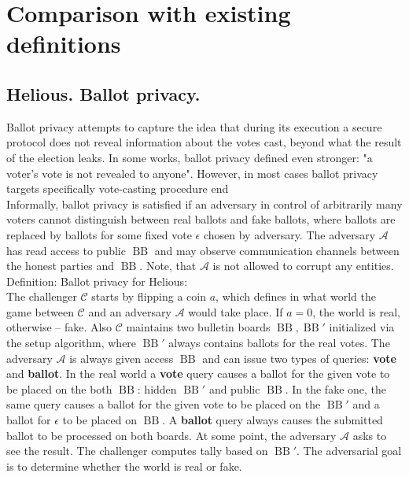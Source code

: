 \documentclass[12pt]{article}
\DeclareMathOperator{\bb}{BB}
\begin{document}
 \section{Comparison with existing definitions}
 \subsection{Helious. Ballot privacy.}
 Ballot privacy attempts to capture the idea that during its execution a secure protocol does not reveal information about the votes cast, beyond what the result of the election leaks. In some works, ballot privacy defined even stronger: "a voter's vote is not revealed to anyone". However, in most cases ballot privacy targets specifically vote-casting procedure end \\ 
  
Informally, ballot privacy is satisfied if an adversary in control of arbitrarily many voters cannot distinguish between real ballots and fake ballots, where ballots are replaced by ballots for some fixed vote $\epsilon$ chosen by adversary. The adversary $\mathcal{A}$ has read access to public $\bb$ and may observe communication channels between the honest parties and $\bb$. Note, that $\mathcal{A}$  is not allowed to corrupt any entities. \\

Definition: Ballot privacy for Helious:\\
The challenger $\mathcal{C}$ starts by flipping a coin $a$, which defines in what world the game between $\mathcal{C}$ and an adversary  $\mathcal{A}$ would take place.  If $a=0$, the world is real, otherwise -- fake. Also $\mathcal{C}$  maintains two bulletin boards $\bb,\bb'$ initialized via the setup algorithm, where $\bb'$ always contains ballots for the real votes.  The adversary $\mathcal{A}$ is always given access $\bb$ and can issue two types of queries: \textbf{vote} and \textbf{ballot}.  In the real world a \textbf{vote} query causes a ballot for the given vote to be placed on the both $\bb$: hidden $\bb'$ and public $\bb$. In the fake one, the same query causes a ballot for the given vote to be placed on the $\bb'$ and a ballot for $\epsilon$  to be placed on $\bb$. A \textbf{ballot} query always causes the submitted ballot to be processed on both boards. At some point, the adversary $\mathcal{A}$ asks to see the result. The challenger computes tally based on $\bb'$. The adversarial goal is to determine whether the world is real or fake.\\
\end{document}
